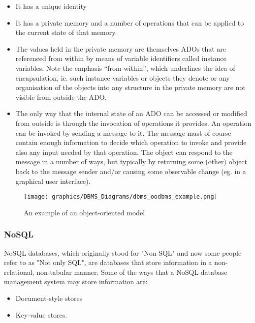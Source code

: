 \documentclass[letterpaper, 12pt]{article}
\renewcommand{\includegraphics}[2][]{\fbox{}}
\begin{document}
\begin{itemize}
  \item It has a unique identity
  \item It has a private memory and a number of operations that can be applied to the current state of that memory. 
  \item The values held in the private memory are themselves ADOs that are referenced from
within by means of variable identifiers called instance variables. Note the emphasis
“from within”, which underlines the idea of encapsulation, ie. such instance variables
or objects they denote or any organisation of the objects into any structure in the
private memory are not visible from outside the ADO.
  \item The only way that the internal state of an ADO can be accessed or modified from
outside is through the invocation of operations it provides. An operation can be
invoked by sending a message to it. The message must of course contain enough
information to decide which operation to invoke and provide also any input needed
by that operation. The object can respond to the message in a number of ways, but
typically by returning some (other) object back to the message sender and/or causing
some observable change (eg. in a graphical user interface).
\end{itemize} \cite{object_oriented_data_model}

\begin{figure}
  \centering
  \texttt{[image: graphics/DBMS\_Diagrams/dbms\_oodbms\_example.png]}
  \caption{An example of an object-oriented model}
\end{figure}

\subsubsection{NoSQL}
NoSQL databases, which originally stood for "Non SQL" and now some people refer to as 
"Not only SQL", are databases that store information in a non-relational, non-tabular
manner. Some of the ways that a NoSQL database management system may store information are: 

\begin{itemize}
  \item Document-style stores
  \item Key-value stores.
\end{itemize}
\end{document}
